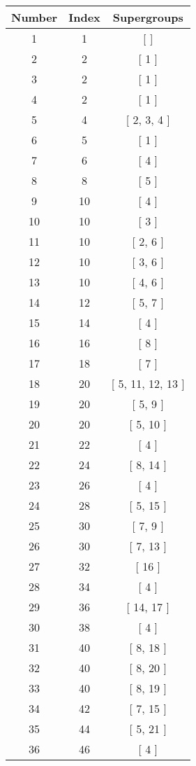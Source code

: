 \begin{center}
\begin{longtable}[H]{|| c c c ||}
\hline
Number &  Index &  Supergroups
\\\hline
1 & 1 & [  ]
\\\hline
2 & 2 & [ 1 ]
\\\hline
3 & 2 & [ 1 ]
\\\hline
4 & 2 & [ 1 ]
\\\hline
5 & 4 & [ 2, 3, 4 ]
\\\hline
6 & 5 & [ 1 ]
\\\hline
7 & 6 & [ 4 ]
\\\hline
8 & 8 & [ 5 ]
\\\hline
9 & 10 & [ 4 ]
\\\hline
10 & 10 & [ 3 ]
\\\hline
11 & 10 & [ 2, 6 ]
\\\hline
12 & 10 & [ 3, 6 ]
\\\hline
13 & 10 & [ 4, 6 ]
\\\hline
14 & 12 & [ 5, 7 ]
\\\hline
15 & 14 & [ 4 ]
\\\hline
16 & 16 & [ 8 ]
\\\hline
17 & 18 & [ 7 ]
\\\hline
18 & 20 & [ 5, 11, 12, 13 ]
\\\hline
19 & 20 & [ 5, 9 ]
\\\hline
20 & 20 & [ 5, 10 ]
\\\hline
21 & 22 & [ 4 ]
\\\hline
22 & 24 & [ 8, 14 ]
\\\hline
23 & 26 & [ 4 ]
\\\hline
24 & 28 & [ 5, 15 ]
\\\hline
25 & 30 & [ 7, 9 ]
\\\hline
26 & 30 & [ 7, 13 ]
\\\hline
27 & 32 & [ 16 ]
\\\hline
28 & 34 & [ 4 ]
\\\hline
29 & 36 & [ 14, 17 ]
\\\hline
30 & 38 & [ 4 ]
\\\hline
31 & 40 & [ 8, 18 ]
\\\hline
32 & 40 & [ 8, 20 ]
\\\hline
33 & 40 & [ 8, 19 ]
\\\hline
34 & 42 & [ 7, 15 ]
\\\hline
35 & 44 & [ 5, 21 ]
\\\hline
36 & 46 & [ 4 ]
\\\hline

\end{longtable}
\end{center}
